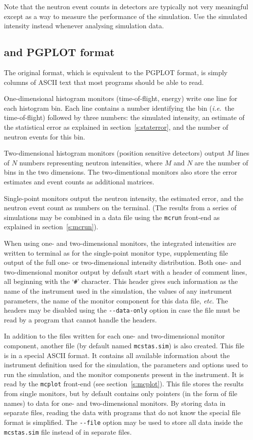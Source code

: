 Note that the neutron event counts in detectors are typically not very
meaningful except as a way to measure the performance of the
simulation. Use the simulated intensity instead whenever analysing
simulation data.

\subsection{\MCS and PGPLOT format}
 
The \MCS original format, which is equivalent to the PGPLOT format, is simply columns of ASCII text that most programs should
be able to read.

One-dimensional histogram monitors (time-of-flight, energy)
write one line for each histogram bin. Each line contains a number
identifying the bin (\textit{i.e}.\ the time-of-flight) followed by
three numbers: the simulated intensity, an estimate of the statistical
error as explained in section~\ref{s:staterror}, and the number of
neutron events for this bin.

Two-dimensional histogram monitors (position sensitive detectors)
output $M$ lines of $N$ numbers representing neutron intensities, where
$M$ and $N$ are the number of bins in the two dimensions. The
two-dimentional monitors also store the error estimates and event counts as additional matrices.

Single-point monitors output the neutron intensity, the estimated
error, and the neutron event count as numbers on the
terminal. (The results from a series of simulations may be combined in a
data file using the \verb+mcrun+ front-end as explained in
section~\ref{s:mcrun}).

When using one- and two-dimensional monitors, the integrated
intensities are written to terminal as for the single-point monitor
type, supplementing file output of the full one- or two-dimensional
intensity distribution. Both one- and two-dimensional monitor output by default start with a
header of comment lines, all beginning with the `\verb+#+' character.
This header gives such information as the name of the instrument used in
the simulation, the values of any instrument parameters, the name of the
monitor component for this data file, \textit{etc}. The headers may be
disabled using the \verb+--data-only+ option in case the file must be
read by a program that cannot handle the headers.

In addition to the files written for each one- and two-dimensional
monitor component, another file (by default named \verb+mcstas.sim+) is
also created. This file is in a special \MCS ASCII format. It contains
all available information about the instrument definition used for the
simulation, the parameters and options used to run the simulation, and
the monitor components present in the instrument. It is read by the
\verb+mcplot+ front-end (see section~\ref{s:mcplot}). This file stores
the results from single monitors, but by default contains only pointers
(in the form of file names) to data for one- and two-dimensional
monitors. By storing data in separate files, reading the data with
programs that do not know the special \MCS file format is
simplified. The \verb+--file+ option may be used to store all data
inside the \verb+mcstas.sim+ file instead of in separate files.

